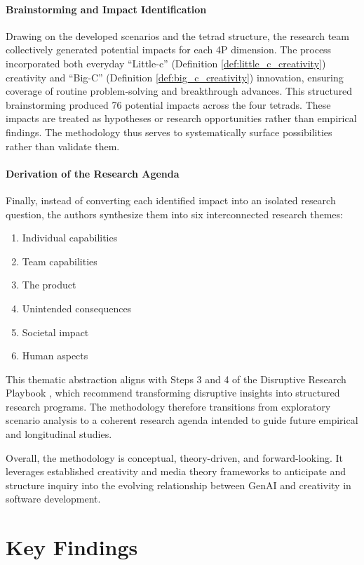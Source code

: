 \paragraph{Brainstorming and Impact Identification}
Drawing on the developed scenarios and the tetrad structure, the research team collectively generated potential impacts for each 4P dimension. The process incorporated both everyday “Little-c” (Definition \ref{def:little_c_creativity}) creativity and “Big-C” (Definition \ref{def:big_c_creativity}) innovation, ensuring coverage of routine problem-solving and breakthrough advances. This structured brainstorming produced 76 potential impacts across the four tetrads. These impacts are treated as hypotheses or research opportunities rather than empirical findings. The methodology thus serves to systematically surface possibilities rather than validate them.

\paragraph{Derivation of the Research Agenda}
Finally, instead of converting each identified impact into an isolated research question, the authors synthesize them into six interconnected research themes:
\begin{enumerate}
    \item Individual capabilities
    \item Team capabilities
    \item The product
    \item Unintended consequences
    \item Societal impact
    \item Human aspects
\end{enumerate}

This thematic abstraction aligns with Steps 3 and 4 of the Disruptive Research Playbook \cite{storey2024disruptive}, which recommend transforming disruptive insights into structured research programs. The methodology therefore transitions from exploratory scenario analysis to a coherent research agenda intended to guide future empirical and longitudinal studies.

Overall, the methodology is conceptual, theory-driven, and forward-looking. It leverages established creativity and media theory frameworks to anticipate and structure inquiry into the evolving relationship between GenAI and creativity in software development.

\section{Key Findings}
